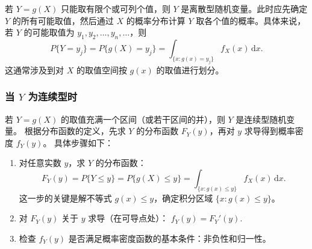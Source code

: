 \documentclass[lang=cn,11pt]{elegantbook}
\begin{document}
若 $Y = g(X)$ 只能取有限个或可列个值，则 $Y$ 是离散型随机变量。此时应先确定 $Y$ 的所有可能取值，然后通过 $X$ 的概率分布计算 $Y$ 取各个值的概率。具体来说，若 $Y$ 的可能取值为 $y_1, y_2, \dots, y_n, \dots$，则
\[
P\{Y = y_j\} = P\{g(X) = y_j\} = \int_{\{x: g(x) = y_j\}} f_X(x) \,\mathrm{d}x.
\]
这通常涉及到对 $X$ 的取值空间按 $g(x)$ 的取值进行划分。

\subsubsection{当 \texorpdfstring{$Y$}{Y} 为连续型时} 

若 $Y = g(X)$ 的取值充满一个区间（或若干区间的并），则 $Y$ 是连续型随机变量。
根据分布函数的定义，先求 $Y$ 的分布函数 $F_Y(y)$，再对 $y$ 求导得到概率密度 $f_Y(y)$。
具体步骤如下：
\begin{enumerate}
    \item 对任意实数 $y$，求 $Y$ 的分布函数：
    \[
    F_Y(y) = P\{Y \le y\} = P\{g(X) \le y\} = \int_{\{x: g(x) \le y\}} f_X(x) \,\mathrm{d}x.
    \]
    这一步的关键是解不等式 $g(x) \le y$，确定积分区域 $\{x: g(x) \le y\}$。
    
    \item 对 $F_Y(y)$ 关于 $y$ 求导（在可导点处）：
    \(
    f_Y(y) = F_Y'(y).
    \)
    
    \item 检查 $f_Y(y)$ 是否满足概率密度函数的基本条件：非负性和归一性。
\end{enumerate}
\end{document}
